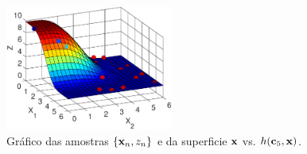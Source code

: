 \begin{SolutionT}
    \begin{figure}[!h]
        \centering
        \includegraphics[width=0.49\textwidth]{chapters/mapeamento/mfiles/mapeamentornr1-nonlinear/minimizando_hx.eps}
        \caption{Gráfico das amostras $\{\VECTOR{x}_n,z_n\}$ e da superficie $\VECTOR{x}$ vs. $h(\VECTOR{c}_5,\VECTOR{x})$.}
        \label{fig:theo:maphcxrnr1:xnyn}
    \end{figure}

\end{SolutionT}


